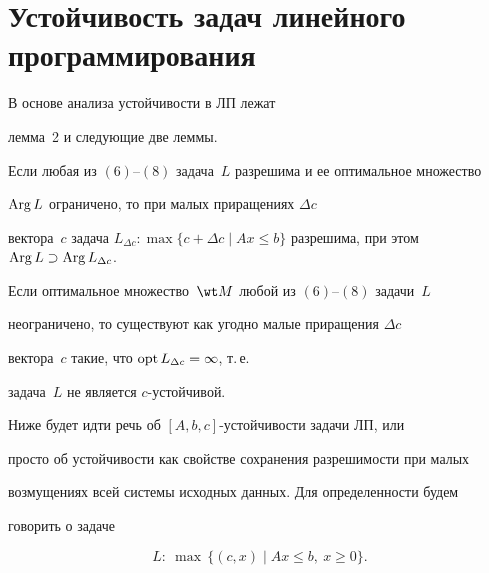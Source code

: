 \section{Устойчивость задач линейного программирования}





В основе анализа устойчивости в ЛП лежат


лемма~2 и следующие две леммы.





\begin{lem}


Если любая из $(6)$--$(8)$ задача~$L$ разрешима и ее оптимальное множество


$\operatorname{Arg} L$ ограничено, то при малых приращениях $\Delta c$


вектора~$c$ задача $L_{\Delta c}: \max\{c+\Delta c\mid Ax\leq


b\}$ разрешима, при этом $\Arg L\supset \Arg L_{\Delta c}$.


\end{lem}





\begin{lem}


Если оптимальное множество~$\wt M$ любой из $(6)$--$(8)$ задачи~$L$ 


неограничено, то существуют как угодно малые приращения $\Delta c$


вектора~$c$ такие, что $\operatorname{opt} L_{\Delta c} = \infty$, т.\,е.


задача~$L$ не является $c$-устойчивой.


\end{lem}





Ниже будет идти речь об $[A,b,c]$-устойчивости задачи ЛП, или


просто об устойчивости как свойстве сохранения разрешимости при малых


возмущениях всей системы исходных данных. Для определенности будем


говорить о задаче


\begin{equation}


L:\ \max\,\{(c,x)\mid Ax\leq b,\ x\geq 0\}.


\end{equation}


